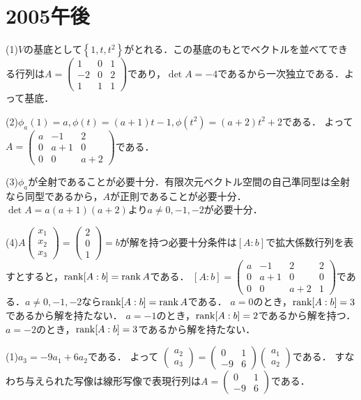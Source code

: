 \documentclass[
		book,
		head_space=20mm,
		foot_space=20mm,
		gutter=10mm,
		line_length=190mm
]{jlreq}
\begin{document}
\section{2005午後}
(1)$V$の基底として$\left\{ 1,t,t^2 \right\}$がとれる．この基底のもとでベクトルを並べてできる行列は$A=\begin{pmatrix}
1&0&1\\
-2&0&2\\
1&1&1
\end{pmatrix}$であり，$\det A=-4$であるから一次独立である．よって基底．

(2)$\phi_a(1)=a,\phi(t)=(a+1)t-1,\phi(t^2)=(a+2)t^2+2$である．
よって$A=\begin{pmatrix}
a&-1&2\\
0&a+1&0\\
0&0&a+2
\end{pmatrix}$である．

(3)$\phi_a$が全射であることが必要十分．有限次元ベクトル空間の自己準同型は全射なら同型であるから，$A$が正則であることが必要十分．
$\det A=a(a+1)(a+2)$より$a\neq 0,-1,-2$が必要十分．

(4)$A\begin{pmatrix}
x_1\\x_2\\x_3
\end{pmatrix}=\begin{pmatrix}
2\\0\\1
\end{pmatrix}=b$が解を持つ必要十分条件は$[A:b]$で拡大係数行列を表すとすると，$\rank [A:b]=\rank A$である．
$[A:b]=\begin{pmatrix}
a&-1&2&2\\
0&a+1&0&0\\
0&0&a+2&1
\end{pmatrix}$である．$a\neq 0,-1,-2$なら$\rank [A:b]=\rank A$である．
$a=0$のとき，$\rank [A:b]=3$であるから解を持たない．
$a=-1$のとき，$\rank [A:b]=2$であるから解を持つ．
$a=-2$のとき，$\rank [A:b]=3$であるから解を持たない．

(1)$a_3=-9a_1+6a_2$である．
よって
$\begin{pmatrix}
a_2\\a_3
\end{pmatrix}=\begin{pmatrix}
0&1\\
-9&6
\end{pmatrix}\begin{pmatrix}
a_1\\a_2
\end{pmatrix}$である．
すなわち与えられた写像は線形写像で表現行列は$A=\begin{pmatrix}
0&1\\
-9&6
\end{pmatrix}$である．
\end{document}
